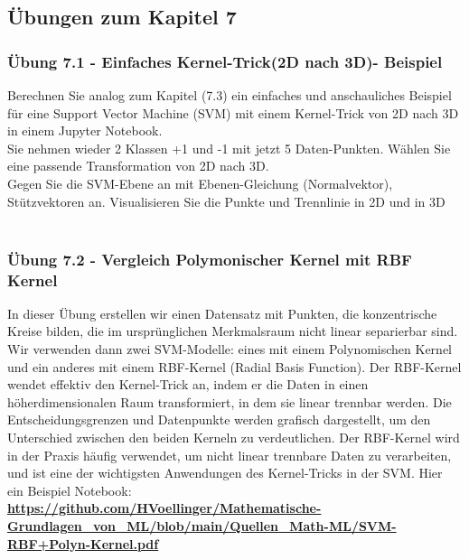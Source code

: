 \documentclass[12pt]{article}
\begin{document}
\subsection{Übungen zum Kapitel 7}



{\color{red}{*******************************************************************\\ 
ab hier bis Ende der Übungen sind die Folien der Vorlesung ML  zu nutzen und diese sind in Latex umzusetzen\\
********************************************************************\\}}
%
\subsubsection{Übung 7.1 - Einfaches Kernel-Trick(2D nach 3D)- Beispiel}
Berechnen Sie analog zum Kapitel (7.3) ein einfaches und anschauliches Beispiel für eine Support Vector Machine (SVM) mit einem Kernel-Trick von 2D nach 3D in einem Jupyter Notebook.\\
Sie nehmen wieder 2 Klassen +1 und -1 mit jetzt 5 Daten-Punkten. Wählen Sie eine passende Transformation von 2D nach 3D.\\
Gegen Sie die SVM-Ebene an mit Ebenen-Gleichung (Normalvektor), Stützvektoren an. Visualisieren Sie die Punkte und Trennlinie in 2D und in 3D \\[0.2cm]\\
\subsubsection{Übung 7.2 - Vergleich Polymonischer Kernel mit RBF Kernel}
In dieser Übung erstellen wir einen Datensatz mit Punkten, die konzentrische Kreise bilden, die im ursprünglichen Merkmalsraum nicht linear separierbar sind. Wir verwenden dann zwei SVM-Modelle: eines mit einem Polynomischen Kernel und ein anderes mit einem RBF-Kernel (Radial Basis Function). Der RBF-Kernel wendet effektiv den Kernel-Trick an, indem er die Daten in einen höherdimensionalen Raum transformiert, in dem sie linear trennbar werden. Die Entscheidungsgrenzen und Datenpunkte werden grafisch dargestellt, um den Unterschied zwischen den beiden Kerneln zu verdeutlichen.
Der RBF-Kernel wird in der Praxis häufig verwendet, um nicht linear trennbare Daten zu verarbeiten, und ist eine der wichtigsten Anwendungen des Kernel-Tricks in der SVM.
Hier ein Beispiel Notebook:\\[0.5cm]
\textbf{\url{https://github.com/HVoellinger/Mathematische-Grundlagen_von_ML/blob/main/Quellen_Math-ML/SVM-RBF+Polyn-Kernel.pdf}}\\[0.5cm]
\end{document}
